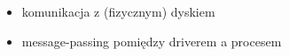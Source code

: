 \begin{itemize}
	\item komunikacja z (fizycznym) dyskiem
	\item message-passing pomiędzy driverem a procesem
\end{itemize}
